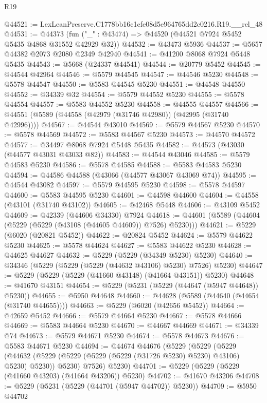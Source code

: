 \begin{lexlean}{R19}
\begin{coremodule}
@44521 := LexLeanPreserve.C1778bb16c1cfe08d5e964765dd2c0216.R19.__rel_48
@44531 := @44373 (fun ("_" : @43474) => @44520 (@44521 @7924 @5452 @5435 @4868 @31552 @42929 @32))
@44532 := @43473 @5936
@44537 := @5657 @44382 @2073 @2080 @2349 @42940
@44541 := @41200 @8068 @7924 @5448 @5435
@44543 := @5668 (@24337 @44541)
@44544 := @20779 @5452
@44545 := @44544 @42964
@44546 := @5579 @44545
@44547 := @44546 @5230
@44548 := @5578 @44547
@44550 := @5583 @44545 @5230
@44551 := @44548 @44550
@44552 := @34339 @32
@44554 := @5579 @44552 @5230
@44555 := @5578 @44554
@44557 := @5583 @44552 @5230
@44558 := @44555 @44557
@44566 := @44551 (@5589 (@44558 (@42979 (@31746 @42980)) (@42995 (@31740 @42996))))
@44567 := @44544 @43010
@44569 := @5579 @44567 @5230
@44570 := @5578 @44569
@44572 := @5583 @44567 @5230
@44573 := @44570 @44572
@44577 := @34497 @8068 @7924 @5448 @5435
@44582 := @44573 (@43030 (@44577 @43031 @43033 @82))
@44583 := @44544 @43046
@44585 := @5579 @44583 @5230
@44586 := @5578 @44585
@44588 := @5583 @44583 @5230
@44594 := @44586 @44588 (@43066 (@44577 @43067 @43069 @74))
@44595 := @44544 @43082
@44597 := @5579 @44595 @5230
@44598 := @5578 @44597
@44600 := @5583 @44595 @5230
@44601 := @44598 @44600
@44604 := @44558 (@43101 (@31740 @43102))
@44605 := @42468 @5448
@44606 := @43109 @5452
@44609 := @42339 (@44606 @34330) @7924
@44618 := @44601 (@5589 (@44604 (@5229 (@5229 (@43108 (@44605 @44609)) @7526) @5230)))
@44621 := @5229 (@6020 (@20821 @5452))
@44622 := @20824 @5452
@44624 := @5579 @44622 @5230
@44625 := @5578 @44624
@44627 := @5583 @44622 @5230
@44628 := @44625 @44627
@44632 := @5229 (@5229 (@34349 @5230) @5230)
@44640 := @34346 (@5229 (@5229 (@5229 (@44632 @43106) @5230) @7526) @5230)
@44647 := @5229 (@5229 (@5229 (@41660 @43148) (@41664 @43151)) @5230)
@44648 := @41670 @43151
@44654 := @5229 (@5231 (@5229 (@44647 (@5947 @44648)) @5230))
@44655 := @5950 @44648
@44660 := @44628 (@5589 (@44640 (@44654 (@31740 @44655))))
@44663 := @5229 (@6020 (@42656 @5452))
@44664 := @42659 @5452
@44666 := @5579 @44664 @5230
@44667 := @5578 @44666
@44669 := @5583 @44664 @5230
@44670 := @44667 @44669
@44671 := @34339 @74
@44673 := @5579 @44671 @5230
@44674 := @5578 @44673
@44676 := @5583 @44671 @5230
@44694 := @44674
    @44676
    (@5229
      (@5229
        (@5229
          (@44632 (@5229 (@5229 (@5229 (@5229 (@31726 @5230) @5230) @43106) @5230) @5230))
          @5230)
        @7526)
      @5230)
@44701 := @5229 (@5229 (@5229 (@41660 @43203) (@41664 @43206)) @5230)
@44702 := @41670 @43206
@44708 := @5229 (@5231 (@5229 (@44701 (@5947 @44702)) @5230))
@44709 := @5950 @44702

\end{coremodule}
\end{lexlean}
